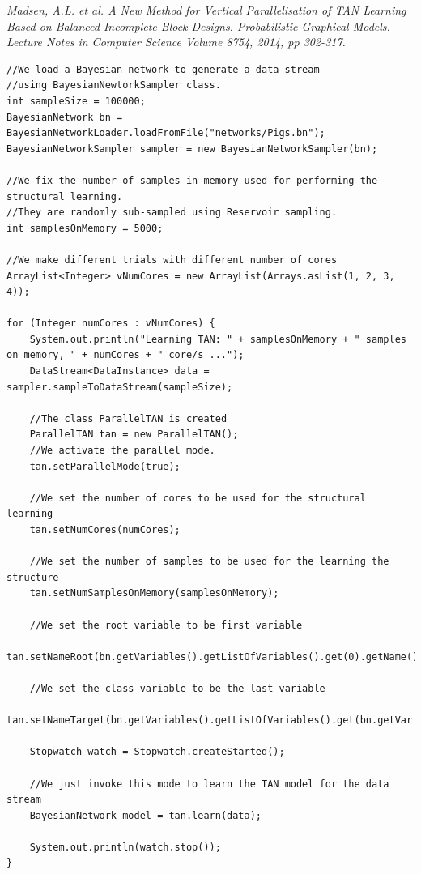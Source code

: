 \textit{Madsen, A.L. et al. A New Method for Vertical Parallelisation of TAN Learning Based on Balanced Incomplete 
Block Designs. Probabilistic Graphical Models. Lecture Notes in Computer Science Volume 8754, 2014, pp 302-317.}

\begin{lstlisting}
//We load a Bayesian network to generate a data stream
//using BayesianNewtorkSampler class.
int sampleSize = 100000;
BayesianNetwork bn = BayesianNetworkLoader.loadFromFile("networks/Pigs.bn");
BayesianNetworkSampler sampler = new BayesianNetworkSampler(bn);

//We fix the number of samples in memory used for performing the structural learning.
//They are randomly sub-sampled using Reservoir sampling.
int samplesOnMemory = 5000;

//We make different trials with different number of cores
ArrayList<Integer> vNumCores = new ArrayList(Arrays.asList(1, 2, 3, 4));

for (Integer numCores : vNumCores) {
    System.out.println("Learning TAN: " + samplesOnMemory + " samples on memory, " + numCores + " core/s ...");
    DataStream<DataInstance> data = sampler.sampleToDataStream(sampleSize);

    //The class ParallelTAN is created
    ParallelTAN tan = new ParallelTAN();
    //We activate the parallel mode.
    tan.setParallelMode(true);

    //We set the number of cores to be used for the structural learning
    tan.setNumCores(numCores);

    //We set the number of samples to be used for the learning the structure
    tan.setNumSamplesOnMemory(samplesOnMemory);

    //We set the root variable to be first variable
    tan.setNameRoot(bn.getVariables().getListOfVariables().get(0).getName());

    //We set the class variable to be the last variable
    tan.setNameTarget(bn.getVariables().getListOfVariables().get(bn.getVariables().getListOfVariables().size()-1).getName());

    Stopwatch watch = Stopwatch.createStarted();

    //We just invoke this mode to learn the TAN model for the data stream
    BayesianNetwork model = tan.learn(data);

    System.out.println(watch.stop());
}
\end{lstlisting}


